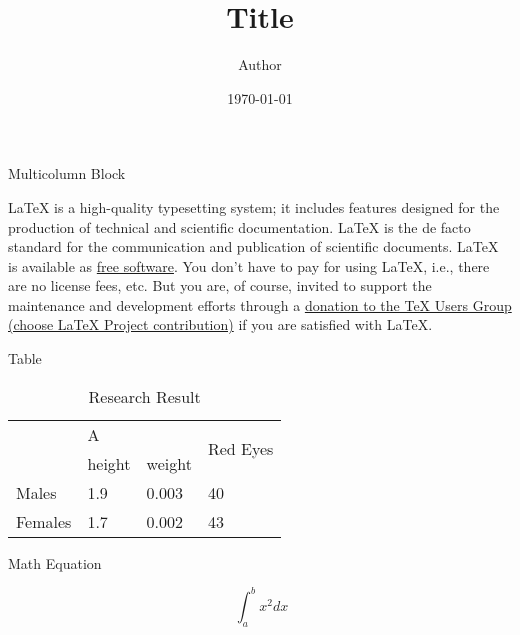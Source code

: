 \documentclass{beamer}
\title{Title}
\author{Author}
\date{\today}
\begin{document}
\maketitle
\begin{frame}{Multicolumn Block}

\begin{multicols}{2}
LaTeX is a high-quality typesetting system; it includes features
designed for the production of technical and scientific documentation.
LaTeX is the de facto standard for the communication and publication of
scientific documents. LaTeX is available as
\href{https://www.latex-project.org/lppl/}{free software}. You don't
have to pay for using LaTeX, i.e., there are no license fees, etc. But
you are, of course, invited to support the maintenance and development
efforts through a \href{https://www.tug.org/donate.html}{donation to the
TeX Users Group (choose LaTeX Project contribution)} if you are
satisfied with LaTeX.

\end{multicols}
\end{frame}
\begin{frame}{Table}

\begin{table}
\caption{Research Result}
\begin{tabular}{|l|l|l|l|}\hline
\multirow{2}{*}{}&\multicolumn{2}{|l|}{A}&\multirow{2}{*}{Red Eyes}\\\cline{2-2}\cline{3-3}
\multirow{2}{*}{ }&height&weight&\multirow{2}{*}{ }\\\cline{1-1}\cline{2-2}\cline{3-3}\cline{4-4}
Males&1.9&0.003&40\\\cline{1-1}\cline{2-2}\cline{3-3}\cline{4-4}
Females&1.7&0.002&43\\\cline{1-1}\cline{2-2}\cline{3-3}\cline{4-4}
\end{tabular}
\end{table}

\end{frame}
\begin{frame}{Math Equation}

\[\ \int_a^bx^2dx\]
\end{frame}
\end{document}

